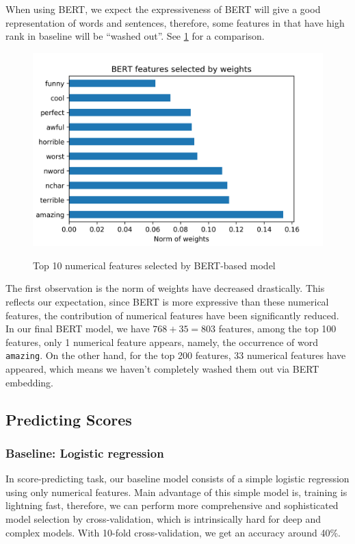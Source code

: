 \documentclass{article}
\begin{document}
When using BERT, we expect the expressiveness of BERT will give a good
representation of words and sentences, therefore, some features in that
have high rank in baseline will be ``washed out''. See \ref{fig4} for a 
comparison.
\begin{figure}
\begin{center}
\label{fig4}
\includegraphics[scale=0.6]{top_10_bert}
\caption{Top 10 numerical features selected by BERT-based model}
\end{center}
\end{figure}
The first observation is the norm of weights have decreased drastically. This
reflects our expectation, since BERT is more expressive than these numerical
features, the contribution of numerical features have been significantly 
reduced. In our final BERT model, we have $768+35=803$ features, among
the top 100 features, only 1 numerical feature appears, namely, the 
occurrence of word \texttt{amazing}. On the other hand, for the top 200
features, 33 numerical features have appeared, which means we haven't
completely washed them out via BERT embedding. 
\subsection{Predicting Scores}
\subsubsection{Baseline: Logistic regression}
In score-predicting task, our baseline model consists of a simple logistic 
regression using only numerical features. Main advantage of this simple
model is, training is lightning fast, therefore, we can perform more 
comprehensive and sophisticated model selection by cross-validation, which
is intrinsically hard for deep and complex models. With 10-fold 
cross-validation, we get an accuracy around 40\%.
\end{document}
